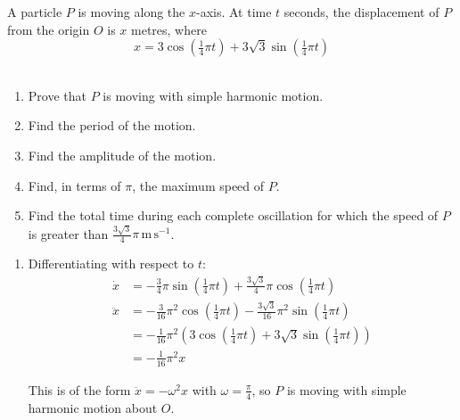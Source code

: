 \documentclass[leqno]{article}
\begin{document}
\djsFrontMatter
\begin{enumerate}[
  label=\textbf{\arabic*.},
  leftmargin=*,
  topsep=0pt,
  partopsep=0pt,
  parsep=0pt
]

\questionitem

A particle $P$ is moving along the $x$-axis. At time $t$ seconds, the displacement of $P$ from the origin $O$ is $x$ metres, where
\[
x = 3\cos\left(\tfrac{1}{4}\pi t\right) + 3\sqrt{3}\sin\left(\tfrac{1}{4}\pi t\right)
\]
\\
\begin{enumerate}[label=\textbf{(\alph*)}]
\item Prove that $P$ is moving with simple harmonic motion.  \\
\item Find the period of the motion.  \\
\item Find the amplitude of the motion.  \\
\item Find, in terms of $\pi$, the maximum speed of $P$.  \\
\item Find the total time during each complete oscillation for which the speed of $P$ is greater than $\frac{3\sqrt{3}}{4}\pi\,\mathrm{m\,s^{-1}}$.  \\
\end{enumerate}

\vspace*{10pt}

\begin{djsSolution}
\begin{enumerate}[label=\textbf{(\alph*)}, start=1]
\item Differentiating with respect to \(t\):
\begin{align*}
\dot{x}&=-\tfrac{3}{4}\pi\sin\left(\tfrac{1}{4}\pi t\right)+\tfrac{3\sqrt{3}}{4}\pi\cos\left(\tfrac{1}{4}\pi t\right)\\
\ddot{x}&=-\tfrac{3}{16}\pi^2\cos\left(\tfrac{1}{4}\pi t\right)-\tfrac{3\sqrt{3}}{16}\pi^2\sin\left(\tfrac{1}{4}\pi t\right)\\
&=-\tfrac{1}{16}\pi^2\left(3\cos\left(\tfrac{1}{4}\pi t\right)+3\sqrt{3}\sin\left(\tfrac{1}{4}\pi t\right)\right)\\
&=-\tfrac{1}{16}\pi^2 x
\end{align*}

This is of the form \(\ddot{x}=-\omega^2x\) with \(\omega=\frac{\pi}{4}\), so \(P\) is moving with simple harmonic motion about \(O\).


\end{enumerate}
\end{djsSolution}
\end{enumerate}
\end{document}
